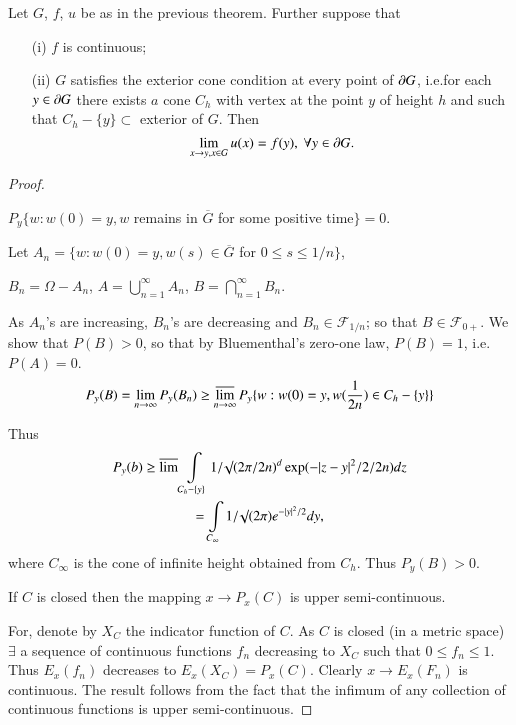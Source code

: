 \begin{theorem*}
Let $G$, $f$, $u$ be as in the previous theorem. Further suppose that
\begin{itemize}
\item[\rm(i)] $f$ is continuous;

\item[\rm(ii)] $G$ satisfies the exterior cone condition at every
  point of $\partial G$, i.e.\@ for each $y\in \partial G$ there exists $a$ cone
  $C_{h}$ with vertex at the point $y$ of height $h$ and such that
  $C_{h}-\{y\}\subset$ exterior of $G$. Then
$$
\lim\limits_{x\to y,x\in G}u(x)=f(y),\ \forall y\in \p G.
$$\pageoriginale
\end{itemize}
\end{theorem*}

\begin{proof}
\setcounter{step}{0}
\begin{step}%
$P_{y}\{w:w(0)=y,w$ remains in $\overline{G}$ for some positive
  time$\}=0$.

Let $A_{n}=\{w:w(0)=y,w(s)\in \overline{G}$ for $0\leq s\leq 1/n\}$,

$B_{n}=\Omega-A_{n}$, $A=\bigcup\limits^{\infty}_{n=1}A_{n}$,
$B=\bigcap\limits^{\infty}_{n=1}B_{n}$. 
\end{step}

As $A_{n}$'s are increasing, $B_{n}$'s are decreasing and $B_{n}\in
\mathscr{F}_{1/n}$; so that $B\in \mathscr{F}_{0+}$. We show that
$P(B)>0$, so that by Bluementhal's zero-one law, $P(B)=1$, i.e.\@
$P(A)=0$.
$$
P_{y}(B)=\lim\limits_{n\to \infty}P_{y}(B_{n})\geq
\varlimsup\limits_{n\to \infty}P_{y}\{w:w(0)=y,w(\frac{1}{2n})\in C_{h}-\{y\}\}
$$

Thus
\begin{gather*}
P_{y}(b)\geq \varlimsup
\int\limits_{C_{h}-\{y\}}1/\surd(2\pi/2n)^{d}\exp
(-|z-y|^{2}/2/2n)dz\\
=\int\limits_{C_{\infty}}1/\surd(2\pi)e^{-|y|^{2}/2}dy,
\end{gather*}
where $C_{\infty}$ is the cone of infinite height obtained from
$C_{h}$. Thus $P_{y}(B)>0$.

\begin{step}%
If $C$ is closed then the mapping $x\to P_{x}(C)$ is upper semi-continuous.
\end{step}

For, denote by $X_{C}$ the indicator function of $C$. As $C$ is closed
(in a metric space) $\exists$ a sequence of continuous functions
$f_{n}$ decreasing to $X_{C}$ such that $0\leq f_{n}\leq 1$. Thus
$E_{x}(f_{n})$ decreases to $E_{x}(X_{C})=P_{x}(C)$. Clearly $x\to
E_{x}(F_{n})$ is continuous. The result follows from the fact that the
infimum of any collection of continuous functions is upper
semi-continuous.


\end{proof}

